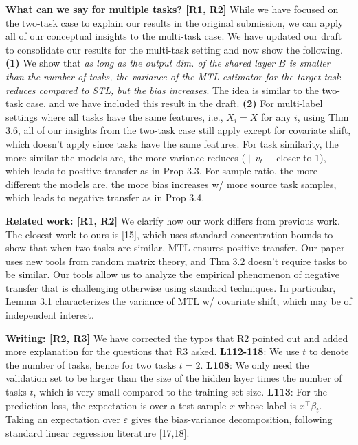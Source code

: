 \documentclass{article}
\begin{document}
\textbf{What can we say for multiple tasks? [R1, R2]}
While we have focused on the two-task case to explain our results in the original submission, we can apply all of our conceptual insights to the multi-task case.
We have updated our draft to consolidate our results for the multi-task setting and now show the following.
\textbf{(1)} We show that \textit{as long as the output dim. of the shared layer $B$ is smaller than the  number of tasks, the variance of the MTL estimator for the target task reduces compared to STL, but the bias increases}.
The idea is similar to the two-task case, and we have included this result in the draft.
\textbf{(2)} For multi-label settings where all tasks have the same features, i.e., $X_i = X$ for any $i$, using Thm 3.6, all of our insights from the two-task case still apply except for covariate shift, which doesn't apply since tasks have the same features.
For task similarity, the more similar the models are, the more variance reduces ($\|{v_t}\|$ closer to 1), which leads to positive transfer as in Prop 3.3.
For sample ratio, the more different the models are, the more bias increases w/ more source task samples, which leads to negative transfer as in Prop 3.4.

\textbf{Related work: [R1, R2]} We clarify how our work differs from previous work. The closest work to ours is [15], which uses standard concentration bounds to show that when two tasks are similar, MTL ensures positive transfer.
Our paper uses new tools from random matrix theory, and Thm 3.2 doesn't require tasks to be similar.
Our tools allow us to analyze the empirical phenomenon of negative transfer that is challenging otherwise using standard techniques.
In particular, Lemma 3.1 characterizes the variance of MTL w/ covariate shift, which may be of independent interest.

\textbf{Writing: [R2, R3]}
We have corrected the typos that R2 pointed out and added more explanation for the questions that R3 asked.
\textbf{L112-118}: We use $t$ to denote the number of tasks, hence for two tasks $t = 2$.
\textbf{L108}: We only need the validation set to be larger than the size of the hidden layer times the number of tasks $t$, which is very small compared to the training set size.
\textbf{L113}: For the prediction loss, the expectation is over a test sample $x$ whose label is $x^{\top}\beta_t$.
Taking an expectation over $\varepsilon$ gives the bias-variance decomposition, following standard linear regression literature [17,18].
\end{document}
